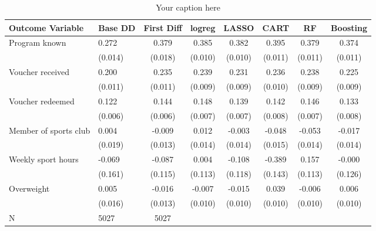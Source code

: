 \begin{sidewaystable*}
\centering
\begin{tabular}{llcccccc}
\hline
Outcome Variable & Base DD & First Diff & logreg & LASSO & CART & RF & Boosting \\
\hline
Program known & 0.272 & 0.379 & 0.385 & 0.382 & 0.395 & 0.379 & 0.374 \\
  & (0.014) & (0.018) & (0.010) & (0.010) & (0.011) & (0.011) & (0.011) \\
Voucher received & 0.200 & 0.235 & 0.239 & 0.231 & 0.236 & 0.238 & 0.225 \\
  & (0.011) & (0.011) & (0.009) & (0.009) & (0.010) & (0.009) & (0.009) \\
Voucher redeemed & 0.122 & 0.144 & 0.148 & 0.139 & 0.142 & 0.146 & 0.133 \\
  & (0.006) & (0.006) & (0.007) & (0.007) & (0.008) & (0.007) & (0.008) \\
Member of sports club & 0.004 & -0.009 & 0.012 & -0.003 & -0.048 & -0.053 & -0.017 \\
  & (0.019) & (0.013) & (0.014) & (0.014) & (0.015) & (0.014) & (0.014) \\
Weekly sport hours & -0.069 & -0.087 & 0.004 & -0.108 & -0.389 & 0.157 & -0.000 \\
  & (0.161) & (0.115) & (0.113) & (0.118) & (0.143) & (0.113) & (0.126) \\
Overweight & 0.005 & -0.016 & -0.007 & -0.015 & 0.039 & -0.006 & 0.006 \\
  & (0.016) & (0.013) & (0.010) & (0.010) & (0.010) & (0.010) & (0.010) \\
\hline
N & 5027 & 5027  &  &  &  &  \\
\hline
\end{tabular}
\caption{Your caption here}
\label{tab:your_label}
\end{sidewaystable*}